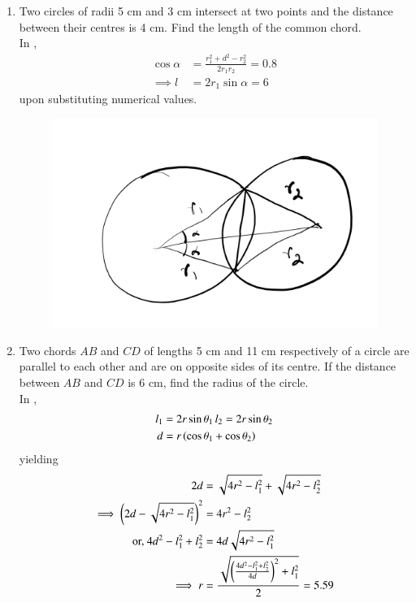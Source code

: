 \begin{enumerate}[label=\thesubsection.\arabic*,ref=\thesubsection.\theenumi]
\begin{figure}[H]
\begin{center}
	\end{center}
	\caption{}
	\label{fig:ncert-circ-2}	
\end{figure}
%
%
\item Two circles of radii 5 cm and 3 cm intersect at two points and the distance between their centres is 4 cm. Find the length of the common chord.
	\\
		\solution 
	In , 
\begin{align}
	\cos \alpha &= \frac{r_1^2+d^2-r_2^2}{2r_1r_2} = 0.8
	\\
\implies	l &= 2r_1\sin \alpha = 6
\end{align}
upon substituting numerical values.
\begin{figure}[H]
	\begin{center}
		{\includegraphics[width=0.6\columnwidth]{figs/ncert/circle/3.png}}
	\end{center}
	\caption{}
	\label{fig:ncert-circ-3}	
\end{figure}
%
\item Two chords $AB$ and $CD$ of lengths 5 cm and 11 cm respectively of a circle are parallel
to each other and are on opposite sides of its centre. If the distance between $AB$ and
$CD$ is 6 cm, find the radius of the circle.
	\\
		\solution 
	In , 
\begin{align}
	l_1&=2r \sin \theta_1\,
	l_2=2r \sin \theta_2
	\\
	d &= r \left(\cos \theta_1+\cos \theta_2\right)
\end{align}
yielding
\begin{align}
	2d &=  \sqrt{4r^2-l_1^2}+\sqrt{4r^2-l_2^2}
	\\
	\implies 
	\left(2d -  \sqrt{4r^2-l_1^2}\right)^2&=4r^2-l_2^2
	\\
	\text{or, }4d^2 -l_1^2+l_2^2&=4d\sqrt{4r^2-l_1^2}
	\\
	\implies r &= \frac{\sqrt{\left(\frac{4d^2 -l_1^2+l_2^2}{4d}\right)^2+l_1^2}}{2} = 5.59 
\end{align}

\end{enumerate}
